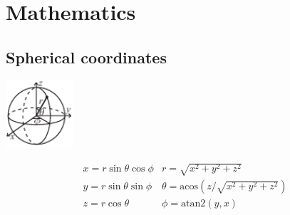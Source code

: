 
\chapter{Mathematics}

\section{Spherical coordinates}

\begin{center}
\includegraphics[width=25mm]{content/math/sphericalCoordinates}
\end{center}
\[\begin{array}{cc}
x = r\sin\theta\cos\phi & r = \sqrt{x^2+y^2+z^2}\\
y = r\sin\theta\sin\phi & \theta = \textrm{acos}(z/\sqrt{x^2+y^2+z^2})\\
z = r\cos\theta & \phi = \textrm{atan2}(y,x)
\end{array}\]

